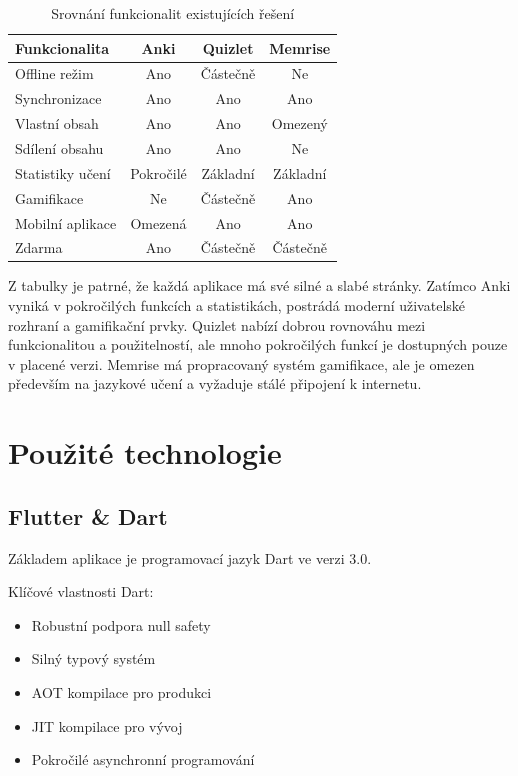 \documentclass[12pt, a4paper, oneside]{report}
\begin{document}
	\begin{table}[h]
		\centering
		\begin{tabular}{lccc}
			\toprule
			\textbf{Funkcionalita} & \textbf{Anki} & \textbf{Quizlet} & \textbf{Memrise} \\
			\midrule
			Offline režim & Ano & Částečně & Ne \\
			Synchronizace & Ano & Ano & Ano \\
			Vlastní obsah & Ano & Ano & Omezený \\
			Sdílení obsahu & Ano & Ano & Ne \\
			Statistiky učení & Pokročilé & Základní & Základní \\
			Gamifikace & Ne & Částečně & Ano \\
			Mobilní aplikace & Omezená & Ano & Ano \\
			Zdarma & Ano & Částečně & Částečně \\
			\bottomrule
		\end{tabular}
		\caption{Srovnání funkcionalit existujících řešení}
		\label{tab:functionality-comparison}
	\end{table}

	Z tabulky je patrné, že každá aplikace má své silné a slabé stránky. Zatímco Anki vyniká v pokročilých funkcích a statistikách, postrádá moderní uživatelské rozhraní a gamifikační prvky. Quizlet nabízí dobrou rovnováhu mezi funkcionalitou a použitelností, ale mnoho pokročilých funkcí je dostupných pouze v placené verzi. Memrise má propracovaný systém gamifikace, ale je omezen především na jazykové učení a vyžaduje stálé připojení k internetu.

\chapter{Použité technologie}
	\section{Flutter \& Dart}
	Základem aplikace je programovací jazyk Dart ve verzi 3.0.

	Klíčové vlastnosti Dart:
	\begin{itemize}
		\item Robustní podpora null safety
		\item Silný typový systém
		\item AOT kompilace pro produkci
		\item JIT kompilace pro vývoj
		\item Pokročilé asynchronní programování
	\end{itemize}
\end{document}
